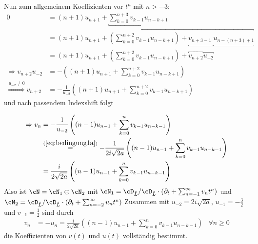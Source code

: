 Nun zum allgemeinem Koeffizienten vor $t^{n}$ mit $n>-3$:
\begin{align*}
0&= (n+1)u_{n+1} + \underbracket{\sum_{k=0}^{n+3} v_{k-1}u_{n-k+1}}
\\&= (n+1)u_{n+1} + \overbracket{(\sum_{k=0}^{n+2} v_{k-1}u_{n-k+1})
  + \underbracket{v_{n+3-1\phantom{\!\!)}}}\underbracket{u_{n-(n+3)+1}}}
\\&= (n+1)u_{n+1} + (\sum_{k=0}^{n+2} v_{k-1}u_{n-k+1})
  + \overbracket{v_{n+2}}\overbracket{u_{-2}}
\\\Rightarrow v_{n+2}u_{-2}&=-\left((n+1)u_{n+1} + \sum_{k=0}^{n+2}
  v_{k-1}u_{n-k+1}\right)
\\\overset{u_{-2}\neq 0}{\Rightarrow} v_{n+2} &= - \frac{1}{u_{-2}}
  \left((n+1)u_{n+1} + \sum_{k=0}^{n+2} v_{k-1}u_{n-k+1}\right)
\end{align*}
und nach passendem Indexshift folgt
\begin{comment} $n+2\rightarrow n$  \end{comment}
\begin{align*}
\Rightarrow v_{n} &= - \frac{1}{u_{-2}}
  \left((n-1)u_{n-1} + \sum_{k=0}^{n} v_{k-1}u_{n-k-1}\right)
\\&\overset{(\ref{eq:bedingung1a})}{=} - \frac{1}{2i\sqrt{2a}}
  \left((n-1)u_{n-1} + \sum_{k=0}^{n} v_{k-1}u_{n-k-1}\right)
\\&= \frac{i}{2\sqrt{2a}}
  \left((n-1)u_{n-1} + \sum_{k=0}^{n} v_{k-1}u_{n-k-1}\right)
\end{align*}
Also ist $\cN=\cN_1\oplus\cN_2$ mit 
$\cN_1=\cD_{\hat L}/\cD_{\hat L}\cdot (\partial_t + \sum_{n=-1}^\infty v_nt^n)$
und
$\cN_2=\cD_{\hat L}/\cD_{\hat L}\cdot (\partial_t + \sum_{n=-2}^\infty u_nt^n)$
Zusammen mit $u_{-2}=2i\sqrt{2a}$, $u_{-1}=-\frac{3}{2}$ und
$v_{-1}=\frac{1}{2}$ sind durch
\begin{align} \label{eq:induktiveFormel}
v_n &= - u_n = \frac{i}{2\sqrt{2a}}
  \left((n-1)u_{n-1} + \sum_{k=0}^{n} v_{k-1}u_{n-k-1}\right) & \forall n \geq 0
\end{align}
die Koeffizienten von $v(t)$ und $u(t)$ vollständig bestimmt.

